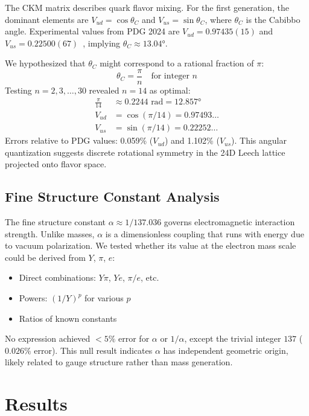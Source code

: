 \documentclass[11pt,a4paper]{article}
\begin{document}
The CKM matrix describes quark flavor mixing. For the first generation, the dominant elements are $V_{ud} = \cos \theta_C$ and $V_{us} = \sin \theta_C$, where $\theta_C$ is the Cabibbo angle. Experimental values from PDG 2024 are $V_{ud} = 0.97435(15)$ and $V_{us} = 0.22500(67)$~\cite{ref007}, implying $\theta_C \approx 13.04°$.

We hypothesized that $\theta_C$ might correspond to a rational fraction of $\pi$:
\begin{equation}
\theta_C = \frac{\pi}{n} \quad \text{for integer } n
\end{equation}
Testing $n = 2, 3, \ldots, 30$ revealed $n=14$ as optimal:
\begin{align}
\frac{\pi}{14} &\approx 0.2244 \text{ rad} = 12.857° \\
V_{ud} &= \cos(\pi/14) = 0.97493\ldots \\
V_{us} &= \sin(\pi/14) = 0.22252\ldots
\end{align}
Errors relative to PDG values: 0.059\% ($V_{ud}$) and 1.102\% ($V_{us}$). This angular quantization suggests discrete rotational symmetry in the 24D Leech lattice projected onto flavor space.

\subsection{Fine Structure Constant Analysis}

The fine structure constant $\alpha \approx 1/137.036$ governs electromagnetic interaction strength. Unlike masses, $\alpha$ is a dimensionless coupling that runs with energy due to vacuum polarization. We tested whether its value at the electron mass scale could be derived from $Y$, $\pi$, $e$:
\begin{itemize}
\item Direct combinations: $Y \pi$, $Y e$, $\pi/e$, etc.
\item Powers: $(1/Y)^p$ for various $p$
\item Ratios of known constants
\end{itemize}
No expression achieved $<5\%$ error for $\alpha$ or $1/\alpha$, except the trivial integer $137$ ($0.026\%$ error). This null result indicates $\alpha$ has independent geometric origin, likely related to gauge structure rather than mass generation.

\section{Results}
\end{document}
